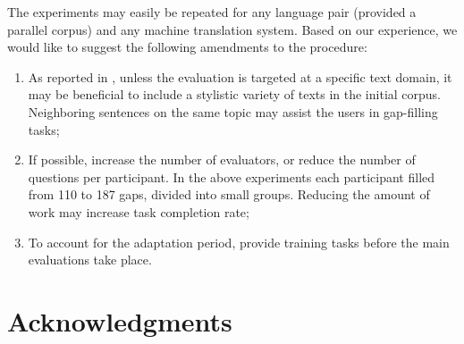 \documentclass[11pt]{article}
\newcommand{\comment}[1]{}
\begin{document}
The experiments may easily be repeated for any language pair (provided a parallel corpus) and
any machine translation system. Based on our experience, we would like to suggest the following amendments to the procedure:
\begin{enumerate}
\item As reported in \cite{oregan13}, unless the evaluation is targeted at a specific text domain, it may be beneficial to include a stylistic variety of texts in the initial corpus. Neighboring sentences on the same topic may assist the users in gap-filling tasks;
\item If possible, increase the number of evaluators, or reduce the number of questions per participant. In the above experiments each participant filled from 110 to 187 gaps, divided into small groups. Reducing the amount of work may increase task completion rate;\comment{MLF's crazy idea: recaptchas?}\comment{EA: the participants did not leave the gaps empty, they just did not attempt the next portions of evaluation after finishing some and getting bored. or did I misunderstand the use of captchas? }
\item To account for the adaptation period, provide training tasks before the main evaluations take place.
\end{enumerate}

\section*{Acknowledgments}




\comment{EA: urls do not show up in web citations, how can I fix that?}

\end{document}
